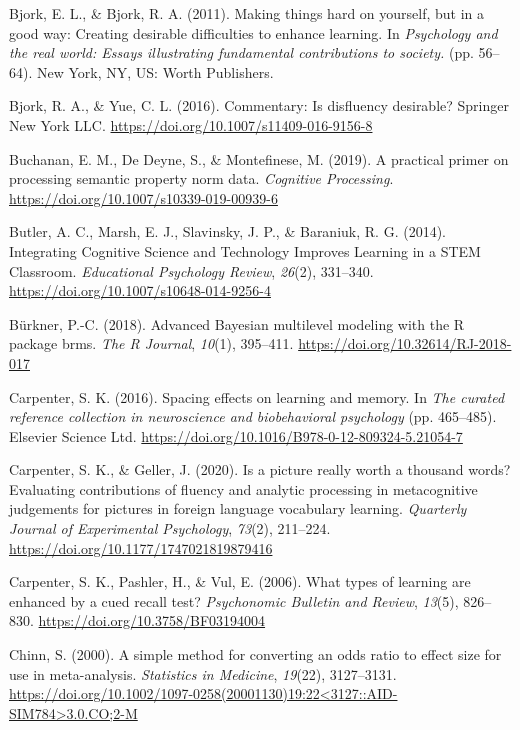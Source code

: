 \documentclass[english,doc]{apa6}
\begin{document}
\leavevmode\hypertarget{ref-Bjork2011}{}%
Bjork, E. L., \& Bjork, R. A. (2011). Making things hard on yourself, but in a good way: Creating desirable difficulties to enhance learning. In \emph{Psychology and the real world: Essays illustrating fundamental contributions to society.} (pp. 56--64). New York, NY, US: Worth Publishers.

\leavevmode\hypertarget{ref-Bjork2016}{}%
Bjork, R. A., \& Yue, C. L. (2016). Commentary: Is disfluency desirable? Springer New York LLC. \url{https://doi.org/10.1007/s11409-016-9156-8}

\leavevmode\hypertarget{ref-Buchanan2019}{}%
Buchanan, E. M., De Deyne, S., \& Montefinese, M. (2019). A practical primer on processing semantic property norm data. \emph{Cognitive Processing}. \url{https://doi.org/10.1007/s10339-019-00939-6}

\leavevmode\hypertarget{ref-Butler2014}{}%
Butler, A. C., Marsh, E. J., Slavinsky, J. P., \& Baraniuk, R. G. (2014). Integrating Cognitive Science and Technology Improves Learning in a STEM Classroom. \emph{Educational Psychology Review}, \emph{26}(2), 331--340. \url{https://doi.org/10.1007/s10648-014-9256-4}

\leavevmode\hypertarget{ref-Burkner2018}{}%
Bürkner, P.-C. (2018). Advanced Bayesian multilevel modeling with the R package brms. \emph{The R Journal}, \emph{10}(1), 395--411. \url{https://doi.org/10.32614/RJ-2018-017}

\leavevmode\hypertarget{ref-Carpenter2016}{}%
Carpenter, S. K. (2016). Spacing effects on learning and memory. In \emph{The curated reference collection in neuroscience and biobehavioral psychology} (pp. 465--485). Elsevier Science Ltd. \url{https://doi.org/10.1016/B978-0-12-809324-5.21054-7}

\leavevmode\hypertarget{ref-Carpenter2020}{}%
Carpenter, S. K., \& Geller, J. (2020). Is a picture really worth a thousand words? Evaluating contributions of fluency and analytic processing in metacognitive judgements for pictures in foreign language vocabulary learning. \emph{Quarterly Journal of Experimental Psychology}, \emph{73}(2), 211--224. \url{https://doi.org/10.1177/1747021819879416}

\leavevmode\hypertarget{ref-Carpenter2006}{}%
Carpenter, S. K., Pashler, H., \& Vul, E. (2006). What types of learning are enhanced by a cued recall test? \emph{Psychonomic Bulletin and Review}, \emph{13}(5), 826--830. \url{https://doi.org/10.3758/BF03194004}

\leavevmode\hypertarget{ref-Chinn2000}{}%
Chinn, S. (2000). A simple method for converting an odds ratio to effect size for use in meta-analysis. \emph{Statistics in Medicine}, \emph{19}(22), 3127--3131. \href{https://doi.org/10.1002/1097-0258(20001130)19:22\%3C3127::AID-SIM784\%3E3.0.CO;2-M}{https://doi.org/10.1002/1097-0258(20001130)19:22\textless{}3127::AID-SIM784\textgreater{}3.0.CO;2-M}
\end{document}
